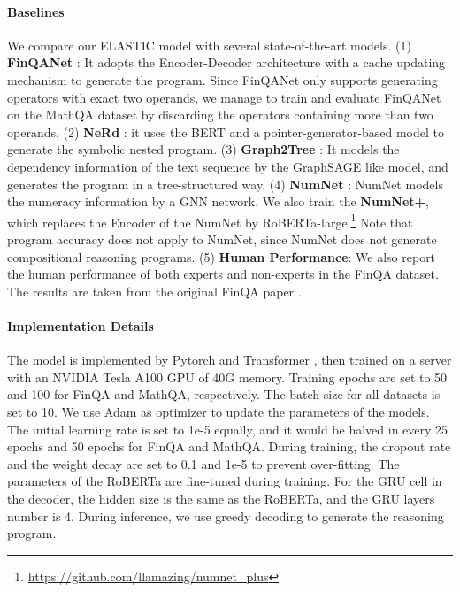 \documentclass{article}
\begin{document}
\paragraph{Baselines}
\label{section: baselines}
We compare our ELASTIC model with several state-of-the-art models. (1) \textbf{FinQANet} \cite{finqa}: It adopts the Encoder-Decoder architecture with a cache updating mechanism to generate the program.  Since FinQANet only supports generating operators with exact two operands, we manage to train and evaluate FinQANet on the MathQA dataset by discarding the operators containing more than two operands. (2) \textbf{NeRd} \cite{NeRd}: it uses the BERT and a pointer-generator-based model to generate the symbolic nested program. (3) \textbf{Graph2Tree} \cite{Graph2Tree}: It models the dependency information of the text sequence by the GraphSAGE \cite{GraphSAGE} like model, and generates the program in a tree-structured way. (4) \textbf{NumNet} \cite{NumNet}: NumNet models the numeracy information by a GNN network. We also train the \textbf{NumNet+}, which replaces the Encoder of the NumNet by RoBERTa-large.\footnote{\url{https://github.com/llamazing/numnet\_plus}} Note that program accuracy does not apply to NumNet, since NumNet does not generate compositional reasoning programs. (5) \textbf{Human Performance}: We also report the human performance of both experts and non-experts in the FinQA dataset. The results are taken from the original FinQA paper \cite{finqa}.

\paragraph{Implementation Details}
\label{section: implementation details}
The model is implemented by Pytorch \cite{PyTorch} and Transformer \cite{Transformers}, then trained on a server with an NVIDIA Tesla A100 GPU of 40G memory. Training epochs are set to 50 and 100 for FinQA and MathQA, respectively. The batch size for all datasets is set to 10. We use Adam as optimizer \cite{Adam} to update the parameters of the models. The initial learning rate is set to 1e-5 equally, and it would be halved in every 25 epochs and 50 epochs for FinQA and MathQA. During training, the dropout rate and the weight decay are set to 0.1 and 1e-5 to prevent over-fitting. The parameters of the RoBERTa are fine-tuned during training. For the GRU cell in the decoder, the hidden size is the same as the RoBERTa, and the GRU layers number is 4. During inference, we use greedy decoding to generate the reasoning program.
\end{document}
